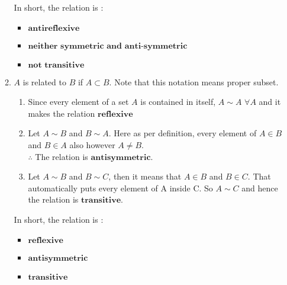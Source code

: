 \documentclass{article}
\begin{document}
\begin{enumerate}
\begin{multicols}{2}
\begin{enumerate}
    In short, the relation is :
    \begin{itemize}
        \item $\textbf{antireflexive}$
        \item $\textbf{neither symmetric and anti-symmetric}$
        \item $\textbf{not transitive}$
    \end{itemize}
    
    \columnbreak
    
    \item $A$ is related to $B$ if $A \subset B$. Note 
        that this notation means proper subset.
        \begin{enumerate}
            \item Since every element of a set $A$ is contained in itself, $A \sim A$ $\forall A$
            and it makes the relation $\textbf{reflexive}$\\
            \item Let $A \sim B$ and $B \sim A$. Here as per definition, every element of $A \in B$ 
            and  $B \in A$ also however $A \neq B$. \\$\therefore$ The relation is $\textbf{antisymmetric}$.\\
            \item  Let $A \sim B$ and $B \sim C$, then it means that $A \in B$ and $B \in C$. That automatically puts 
            every element of A inside C. So $A \sim C$ and hence the relation is $\textbf{transitive}$.\\
        \end{enumerate}
        In short, the relation is :
    \begin{itemize}
        \item $\textbf{reflexive}$
        \item $\textbf{antisymmetric}$
        \item $\textbf{transitive}$
    \end{itemize}
    \end{enumerate}
\end{multicols}
\pagebreak %


\end{enumerate}
\end{document}
